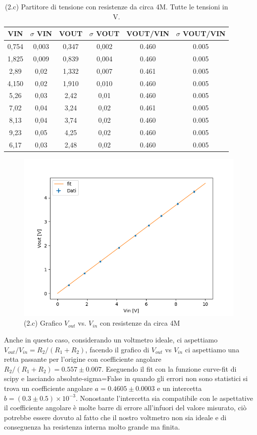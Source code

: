 \documentclass[10pt,a4paper]{article}
\begin{document}
\begin{table}[h]
\centering
\begin{tabular}{|c|c|c|c|c|c|}
\hline 
VIN& $\sigma$ VIN  &VOUT	 & $\sigma$ VOUT& VOUT/VIN & $\sigma$ VOUT/VIN \\
\hline 
0,754 & 0,003 & 0,347 & 0,002 & 0.460 & 0.005 \\
1,825 & 0,009 & 0,839 & 0,004 & 0.460 & 0.005 \\
2,89 & 0,02 & 1,332 & 0,007 & 0.461 & 0.005\\
4,150 & 0,02 & 1,910 & 0,010 & 0.460 & 0.005\\
5,26 & 0,03 & 2,42 & 0,01 & 0.460 & 0.005\\
7,02 & 0,04 & 3,24 & 0,02 & 0.461 & 0.005\\
8,13 & 0,04 & 3,74 & 0,02 & 0.460 & 0.005\\
9,23 & 0,05 & 4,25 & 0,02 & 0.460 & 0.005\\
6,17 & 0,03 & 2,48 & 0,02 & 0.460 & 0.005\\
\hline 
\end{tabular} 
\caption{(2.c) Partitore di tensione con resistenze da circa 4M. Tutte le tensioni in V.\label{t:par2}}
\end{table}


\begin{figure}[h]
\centering
\includegraphics[scale=0.6]{plot_2c.png}

\caption{(2.c) Grafico $V_{out}$ vs. $V_{in}$ con resistenze da circa 4M \label{f:par2}}
\end{figure}

Anche in questo caso, considerando un voltmetro ideale, ci aspettiamo $V_{out}/V_{in} = R_2/(R_1+R_2)$, facendo il grafico di $V_{out}$ vs $V_{in}$ ci aspettiamo una retta passante per l'origine con coefficiente angolare $R_2/(R_1+R_2) = 0.557 \pm 0.007$. Eseguendo il fit con la funzione curve-fit di scipy e lasciando absolute-sigma=False in quando gli errori non sono statistici si trova un coefficiente angolare $a=0.4605\pm0.0003$ e un intercetta $b=(0.3\pm0.5)\times10^{-3}$. Nonostante l'intercetta sia compatibile con le aspettative il coefficiente angolare è molte barre di errore all'infuori del valore misurato, ciò potrebbe essere dovuto al fatto che il nostro voltmetro non sia ideale e di conseguenza ha resistenza interna molto grande ma finita.
\end{document}

